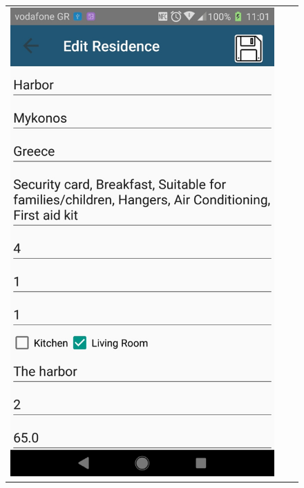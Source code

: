 \documentclass[12pt]{article}
\begin{document}
\begin{center}
\begin{figure}
\begin{tabular}{c c c}
				\includegraphics[scale=0.17, keepaspectratio]{28-editResidence.jpg}  
				&

\end{tabular}
\end{figure}
\end{center}
\end{document}
